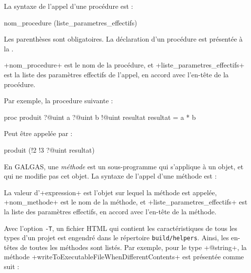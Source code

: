 
La syntaxe de l'appel d'une procédure est :
\begin{galgas}
nom_procedure (liste_parametres_effectifs)
\end{galgas}

Les parenthèses sont obligatoires. La déclaration d'un procédure est présentée à la .

\ggs+nom_procedure+ est le nom de la procédure, et \ggs+liste_parametres_effectifs+ est la liste des paramètres effectifs de l'appel, en accord avec l'en-tête de la procédure.

Par exemple, la procedure suivante :
\begin{galgas}
proc produit ?@uint a ?@uint b !@uint resultat {
  resultat = a * b
}
\end{galgas}

Peut être appelée par :
\begin{galgas}
produit (!2 !3 ?@uint resultat)
\end{galgas}
















En GALGAS, une \emph{méthode} est un sous-programme qui s'applique à un objet, et qui ne modifie pas cet objet. La syntaxe de l'appel d'une méthode est :
\begin{galgas}
\end{galgas}

La valeur d'\ggs+expression+ est l'objet sur lequel la méthode est appelée, \ggs+nom_methode+ est le nom de la méthode, et \ggs+liste_parametres_effectifs+ est la liste des paramètres effectifs, en accord avec l'en-tête de la méthode.

Avec l'option \texttt{-T}, un fichier HTML qui contient les caractéristiques de tous les types d'un projet est engendré dans le répertoire \texttt{build/helpers}. Ainsi, les en-têtes de toutes les méthodes sont listés. Par exemple, pour le type \ggs+@string+, la méthode \ggs+writeToExecutableFileWhenDifferentContents+ est présentée comme suit :

